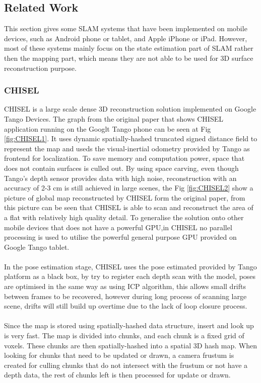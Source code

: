 \documentclass[12pt,twoside]{article}
\begin{document}
\subsection{Related Work}


This section gives some SLAM systems that have been implemented on mobile devices, such as Android phone or tablet, and Apple iPhone or iPad. However, most of these systems mainly focus on the state estimation part of SLAM rather then the mapping part, which means they are not able to be used for 3D surface reconstruction purpose.



\subsubsection{CHISEL}
CHISEL\citep{klingensmith2015chisel} is a large scale dense 3D reconstruction solution implemented on Google Tango Devices. The graph from the original paper that shows CHISEL application running on the Googlt Tango phone can be seen at Fig \ref{fig:CHISEL1}. It uses dynamic spatially-hashed truncated signed distance field\citep{niessner2013real} to represent the map and useds the visual-inertial odometry provided by Tango as frontend for localization. To save memory and computation power, space that does not contain surfaces is culled out. By using space carving, even though Tango's depth sensor provides data with high noise, reconstruction with an accuracy of 2-3 cm is still achieved in large scenes, the Fig \ref{fig:CHISEL2} show a picture of global map reconstructed by CHISEL form the original paper, from this picture can be seen that CHISEL is able to scan and reconstruct the area of a flat with relatively high quality detail. To generalise the solution onto other mobile devices that does not have a powerful GPU,in CHISEL no parallel processing is used to utilise the powerful general purpose GPU provided on Google Tango tablet.\\
\\
In the pose estimation stage, CHISEL uses the pose estimated provided by Tango platform as a black box, by try to register each depth scan with the model, poses are optimised in the same way as using ICP algorithm, this allows small drifts between frames to be recovered, however during long process of scanning large scene, drifts will still build up overtime due to the lack of loop closure process.\\
\\
Since the map is stored using spatially-hashed data structure, insert and look up is very fast. The map is divided into chunks, and each chunk is a fixed grid of voxels. These chunks are then spatially-hashed into a spatial 3D hash map. When looking for chunks that need to be updated or drawn, a camera frustum is created for culling chunks that do not intersect with the frustum or not have a depth data, the rest of chunks left is then processed for update or drawn.\\
\end{document}
